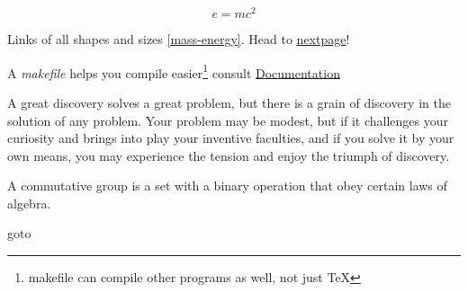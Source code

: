 \documentclass{article}
\begin{document}
    \begin{equation}
        e=mc^2 \label{mass-energy}
    \end{equation}

    Links of all shapes and sizes \ref{mass-energy}. Head to \hyperlink{telport}{nextpage}!


    A \emph{makefile} helps you compile easier\footnote{makefile can compile other programs as well, not just \TeX} consult 
    \href{https://gnu.org/software/make/manual/make.html#toc-Overview-of-make}{Documentation}


    A   great discovery solves a great problem, but there is a grain of discovery in the solution of any problem. Your problem may be modest, but if it challenges your curiosity and brings into play your inventive faculties, and if you solve it by your own means, you may experience the tension and enjoy the triumph of discovery. 


    A commutative group is a set with a binary operation that obey certain laws of algebra.
    
    \newpage

    \hypertarget{telport}{goto} 


    \printindex
\end{document}
